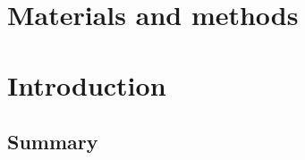 
\chapter{Materials and methods}  
\onehalfspacing


%

\pagebreak







\chapter{Introduction}  %
\onehalfspacing




\pagebreak





%

\section*{Summary} %

